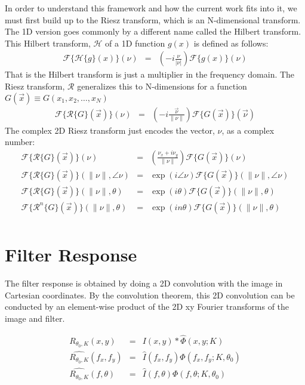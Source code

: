 \documentclass{article}
\begin{document}
In order to understand this framework and how the current work fits into it, we must first build up to the Riesz transform, which is an N-dimensional transform. The 1D version goes commonly by a different name called the Hilbert transform. This Hilbert transform, $ \mathcal{H} $ of a 1D function $ g(x) $ is defined as follows:
\begin{eqnarray}
    \mathcal{F}\{ \mathcal{H}\{g\}(x) \}(\nu) & = & (-i \frac{\nu}{\left| \nu \right|}) \mathcal{F}\{g(x)\}(\nu)
\end{eqnarray}
That is the Hilbert transform is just a multiplier in the frequency domain. The Riesz transform, $ \mathcal{R} $  generalizes this to N-dimensions for a function $ G(\vec{x}) \equiv G(x_1,x_2, \hdots, x_N) $
\begin{eqnarray}
    \mathcal{F}\{ \mathcal{R}\{G\}(\vec{x}) \}(\nu) & = & (-i \frac{\vec{\nu}}{\left\| \nu \right\|}) \mathcal{F}\{G(\vec{x})\}(\vec{\nu})
\end{eqnarray}
The complex 2D Riesz transform just encodes the vector, $ \nu $,  as a complex number:
\begin{eqnarray}
    \mathcal{F}\{ \mathcal{R}\{G\}(\vec{x}) \}(\nu) & = & (\frac{\nu_x +i \nu_y}{\left\| \nu \right\|}) \mathcal{F}\{G(\vec{x})\}(\nu) \\
    \mathcal{F}\{ \mathcal{R}\{G\}(\vec{x}) \}(\|\nu\|,\angle \nu) & = & \exp(i \angle \nu) \mathcal{F}\{G(\vec{x})\}(\|\nu\|,\angle \nu) \\
    \mathcal{F}\{ \mathcal{R}\{G\}(\vec{x}) \}(\|\nu\|,\theta) & = & \exp(i \theta) \mathcal{F}\{G(\vec{x})\}(\|\nu\|,\theta) \\
    \mathcal{F}\{ \mathcal{R}^n\{G\}(\vec{x}) \}(\|\nu\|,\theta) & = & \exp(i n\theta) \mathcal{F}\{G(\vec{x})\}(\|\nu\|,\theta) \\
\end{eqnarray}




\section{Filter Response}

The filter response is obtained by doing a 2D convolution with the image in Cartesian coordinates. By the convolution theorem, this 2D convolution can be conducted by an element-wise product of the 2D xy Fourier transforms of the image and filter.

\begin{eqnarray}
    R_{\theta_0,K}(x,y) & = & I(x,y) \ast \hat{\Phi}(x,y; K) \\
    \widehat{R_{\theta_0,K}}(f_x,f_y) & = & \hat{I}(f_x,f_y) \Phi(f_x,f_y; K, \theta_0) \\
    \widehat{R_{\theta_0,K}}(f,\theta) & = & \hat{I}(f,\theta) \Phi(f,\theta; K, \theta_0)
\end{eqnarray}
\end{document}
